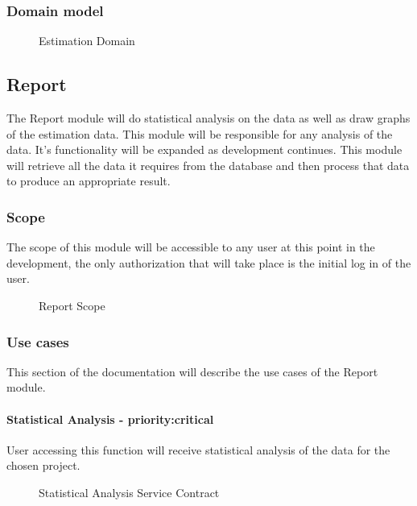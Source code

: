 \subsubsection{Domain model}
	\begin{figure}[H]
	    	\centering
	    	\caption{Estimation Domain}
	    	\label{fig:Estimation_Domain.png}
   	\end{figure}

\subsection{Report}
The Report module will do statistical analysis on the data as well as draw graphs of the estimation data. This module will be responsible for any analysis of the data. It's functionality will be expanded as development continues. This module will retrieve all the data it requires from the database and then process that data to produce an appropriate result.
\subsubsection{Scope}
The scope of this module will be accessible to any user at this point in the development, the only authorization that will take place is the initial log in of the user.
	\begin{figure}[H]
	    	\centering
	    	\caption{Report Scope}
	    	\label{fig:Report_Scope.png}
   	\end{figure}
\subsubsection{Use cases}
	This section of the documentation will describe the use cases of the Report module.
	\paragraph{Statistical Analysis - priority:critical}
	User accessing this function will receive statistical analysis of the data for the chosen project.
	\begin{figure}[H]
	    	\centering
	    	\caption{Statistical Analysis Service Contract}
	    	\label{fig:Report_getStatistics.png Contract}
   	\end{figure}
